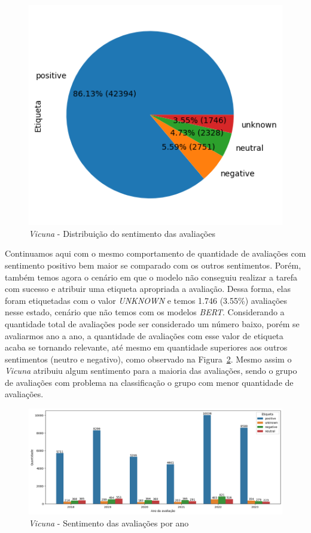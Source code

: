 \begin{figure}
	\centering
	\includegraphics{figs/vicuna/distribuicao_pizza.png}
	\caption{\textit{Vicuna} - Distribuição do sentimento das avaliações}
	\label{img:vicuna_pizza_distribuicao}
\end{figure}

Continuamos aqui com o mesmo comportamento de quantidade de avaliações com sentimento positivo bem maior se comparado com os outros sentimentos. Porém, também temos agora o cenário em que o modelo não conseguiu realizar a tarefa com sucesso e atribuir uma etiqueta apropriada a avaliação. Dessa forma, elas foram etiquetadas com o valor \textit{UNKNOWN} e temos 1.746 (3.55\%) avaliações nesse estado, cenário que não temos com os modelos \textit{BERT}. Considerando a quantidade total de avaliações pode ser considerado um número baixo, porém se avaliarmos ano a ano, a quantidade de avaliações com esse valor de etiqueta acaba se tornando relevante, até mesmo em quantidade superiores aos outros sentimentos (neutro e negativo), como observado na Figura~\ref{img:vicuna_sentimento_ano}. Mesmo assim o \textit{Vicuna} atribuiu algum sentimento para a maioria das avaliações, sendo o grupo de avaliações com problema na classificação o grupo com menor quantidade de avaliações.

\begin{figure}
	\centering
	\includegraphics[width=1\textwidth]{figs/vicuna/sentimento_ano.png}
	\caption{\textit{Vicuna} - Sentimento das avaliações por ano}
	\label{img:vicuna_sentimento_ano}
\end{figure}

